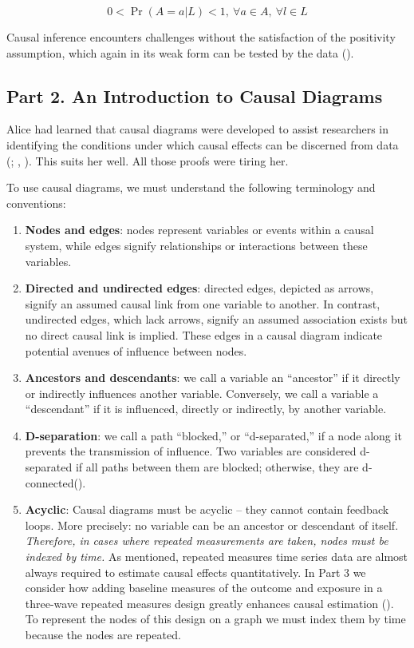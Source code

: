 \documentclass[
  singlecolumn]{article}
\begin{document}
\[
0 < \Pr(A=a|L)<1, ~ \forall a \in A, ~ \forall l \in L
\]

Causal inference encounters challenges without the satisfaction of the
positivity assumption, which again in its weak form can be tested by the
data ().

\subsection{Part 2. An Introduction to Causal
Diagrams}\label{part-2.-an-introduction-to-causal-diagrams}

Alice had learned that causal diagrams were developed to assist
researchers in identifying the conditions under which causal effects can
be discerned from data (; ,
). This suits her well. All those proofs
were tiring her.

To use causal diagrams, we must understand the following terminology and
conventions:

\begin{enumerate}
\def\labelenumi{\arabic{enumi}.}
\item
  \textbf{Nodes and edges}: nodes represent variables or events within a
  causal system, while edges signify relationships or interactions
  between these variables.
\item
  \textbf{Directed and undirected edges}: directed edges, depicted as
  arrows, signify an assumed causal link from one variable to another.
  In contrast, undirected edges, which lack arrows, signify an assumed
  association exists but no direct causal link is implied. These edges
  in a causal diagram indicate potential avenues of influence between
  nodes.
\item
  \textbf{Ancestors and descendants}: we call a variable an ``ancestor''
  if it directly or indirectly influences another variable. Conversely,
  we call a variable a ``descendant'' if it is influenced, directly or
  indirectly, by another variable.
\item
  \textbf{D-separation}: we call a path ``blocked,'' or ``d-separated,''
  if a node along it prevents the transmission of influence. Two
  variables are considered d-separated if all paths between them are
  blocked; otherwise, they are
  d-connected().
\item
  \textbf{Acyclic}: Causal diagrams must be acyclic -- they cannot
  contain feedback loops. More precisely: no variable can be an ancestor
  or descendant of itself. \emph{Therefore, in cases where repeated
  measurements are taken, nodes must be indexed by time.} As mentioned,
  repeated measures time series data are almost always required to
  estimate causal effects quantitatively. In Part 3 we consider how
  adding baseline measures of the outcome and exposure in a three-wave
  repeated measures design greatly enhances causal estimation
  (). To represent the nodes of this
  design on a graph we must index them by time because the nodes are
  repeated.
\end{enumerate}
\end{document}
